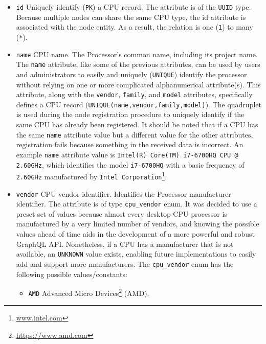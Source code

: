 \begin{itemize}
  \item \texttt{id}
    \newline
    Uniquely identify (\texttt{PK}) a CPU record.
    \newline
    The attribute is of the \texttt{UUID} type.
    \newline
    Because multiple nodes can share the same CPU type, the id attribute is associated
    with the node entity. As a result, the relation is one (\texttt{1}) to many
    (\texttt{*}).

  \item \texttt{name}
    \newline
    CPU name.
    \newline
    The Processor's common name, including its project name.
    \newline
    The \texttt{name} attribute, like some of the previous attributes, can be
    used by users and administrators to easily and uniquely (\texttt{UNIQUE}) identify
    the processor without relying on one or more complicated alphanumerical attribute(s).
    \newline
    This attribute, along with the \texttt{vendor}, \texttt{family}, and \texttt{model}
    attributes, specifically defines a CPU record (\texttt{UNIQUE(name,vendor,family,model)}).
    The quadruplet is used during the node registration procedure to uniquely identify
    if the same CPU has already been registered. It should be noted that if a
    CPU has the same \texttt{name} attribute value but a different value for the
    other attributes, registration fails because something in the received data
    is incorrect.
    \newline
    An example \texttt{name} attribute value is \texttt{Intel(R) Core(TM) i7-6700HQ
    CPU @ 2.60GHz}, which identifies the model \texttt{i7-6700HQ} with a basic
    frequency of \texttt{2.60GHz} manufactured by \texttt{Intel Corporation}\footnote{\url{www.intel.com}}.

  \item \texttt{vendor}
    \newline
    CPU vendor identifier.
    \newline
    Identifies the Processor manufacturer identifier.
    \newline
    The attribute is of type \texttt{cpu\_vendor} enum. It was decided to use a
    preset set of values because almost every desktop CPU processor is
    manufactured by a very limited number of vendors, and knowing the possible values
    ahead of time aids in the development of a more powerful and robust GraphQL API.
    Nonetheless, if a CPU has a manufacturer that is not available, an \texttt{UNKNOWN}
    value exists, enabling future implementations to easily add and support more
    manufacturers.
    \newline
    The \texttt{cpu\_vendor} enum has the following possible values/constants:
    \begin{itemize}
      \item \texttt{AMD}
        \newline
        Advanced Micro Devices\footnote{\url{https://www.amd.com}} (AMD).


\end{itemize}
\end{itemize}
